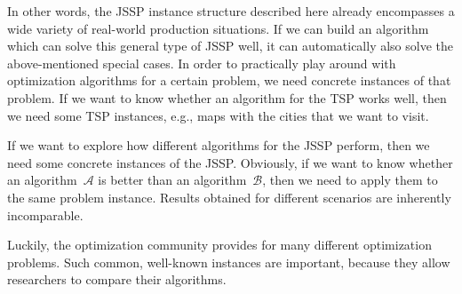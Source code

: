 In other words, the \gls{JSSP} instance structure described here already encompasses a wide variety of real-world production situations.
If we can build an algorithm which can solve this general type of \gls{JSSP} well, it can automatically also solve the above-mentioned special cases.
\endhsection%
%
%
\label{sec:jsspBenchmarkInstances}%
%
In order to practically play around with optimization algorithms for a certain problem, we need concrete instances of that problem.
If we want to know whether an algorithm for the \gls{TSP} works well, then we need some \gls{TSP} instances, e.g., maps with the cities that we want to visit.

If we want to explore how different algorithms for the \gls{JSSP} perform, then we need some concrete instances of the \gls{JSSP}.
Obviously, if we want to know whether an algorithm~$\mathcal{A}$ is better than an algorithm~$\mathcal{B}$, then we need to apply them to the same problem instance.
Results obtained for different scenarios are inherently incomparable.

Luckily, the optimization community provides  for many different optimization problems.
Such common, well-known instances are important, because they allow researchers to compare their algorithms.

